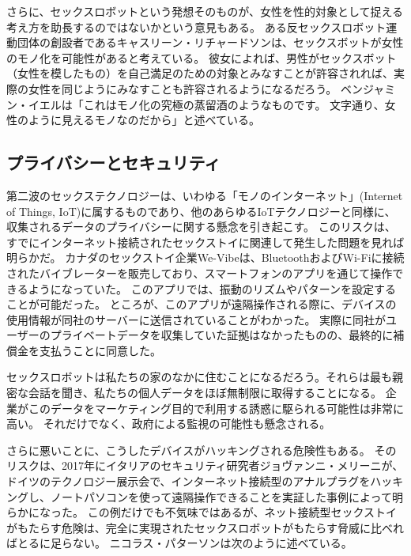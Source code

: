 \documentclass[paper=a4,book,openany]{jlreq} \usepackage{mystyle}
\begin{document}
さらに、セックスロボットという発想そのものが、女性を性的対象として捉える考え方を助長するのではないかという意見もある。
ある反セックスロボット運動団体の創設者であるキャスリーン・リチャードソンは、セックスボットが女性のモノ化を可能性があると考えている。
彼女によれば、男性がセックスボット（女性を模したもの）を自己満足のための対象とみなすことが許容されれば、実際の女性を同じようにみなすことも許容されるようになるだろう\citep{richardson16:_asymm_relat}。
ベンジャミン・イエルは「これはモノ化の究極の蒸留酒のようなものです。
文字通り、女性のように見えるモノなのだから」と述べている\citep{mcdonald19:_sex_robot_are_almos_here}。

\subsection{プライバシーとセキュリティ}

第二波のセックステクノロジーは、いわゆる「モノのインターネット」(Internet of Things, IoT)に属するものであり、他のあらゆるIoTテクノロジーと同様に、収集されるデータのプライバシーに関する懸念を引き起こす。
このリスクは、すでにインターネット接続されたセックストイに関連して発生した問題を見れば明らかだ。
カナダのセックストイ企業We-Vibeは、BluetoothおよびWi-Fiに接続されたバイブレーターを販売しており、スマートフォンのアプリを通じて操作できるようになっていた。
このアプリでは、振動のリズムやパターンを設定することが可能だった。
ところが、このアプリが遠隔操作される際に、デバイスの使用情報が同社のサーバーに送信されていることがわかった。
実際に同社がユーザーのプライベートデータを収集していた証拠はなかったものの、最終的に補償金を支払うことに同意した\citep{freytas-tamura17:_maker_smart_vibrat_settl_data}。

セックスロボットは私たちの家のなかに住むことになるだろう。それらは最も親密な会話を聞き、私たちの個人データをほぼ無制限に取得することになる。
企業がこのデータをマーケティング目的で利用する誘惑に駆られる可能性は非常に高い。
それだけでなく、政府による監視の可能性も懸念される。

さらに悪いことに、こうしたデバイスがハッキングされる危険性もある。
そのリスクは、2017年にイタリアのセキュリティ研究者ジョヴァンニ・メリーニが、ドイツのテクノロジー展示会で、インターネット接続型のアナルプラグをハッキングし、ノートパソコンを使って遠隔操作できることを実証した事例によって明らかになった\citep{oberhaus17:_secur_resear_hacked_bluet_enabl_butt_plug}。
この例だけでも不気味ではあるが、ネット接続型セックストイがもたらす危険は、完全に実現されたセックスロボットがもたらす脅威に比べればとるに足らない。
ニコラス・パターソンは次のように述べている。
\end{document}
